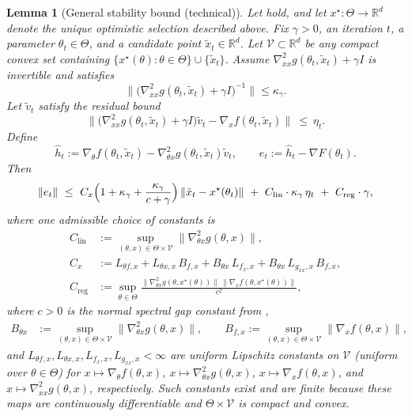\documentclass{article}
\theoremstyle{normaltheorem}
\newtheorem{lemma}[lemma]{Lemma}
\newcommand{\R}{\mathbb{R}}
\begin{document}
\begin{lemma}[General stability bound (technical)]\label{lem:hg-stability-detailed}
Let  hold, and let $x^\star:\Theta\to\R^d$ denote the unique optimistic
selection described above.
Fix \(\gamma>0\), an iteration $t$, a parameter $\theta_t\in\Theta$, and a candidate point $\tilde x_t\in\R^d$.
Let $\mathcal V\subset\R^d$ be any compact convex set containing $\{x^\star(\theta):\theta\in\Theta\}\cup\{\tilde x_t\}$.
Assume \(\nabla^2_{xx}g(\theta_t,\tilde x_t)+\gamma I\) is invertible and satisfies
\[
\big\|\big(\nabla^2_{xx}g(\theta_t,\tilde x_t)+\gamma I\big)^{-1}\big\|\le \kappa_\gamma .
\]
Let $\tilde v_t$ satisfy the residual bound
\[
\big\|\big(\nabla^2_{xx}g(\theta_t,\tilde x_t)+\gamma I\big)\tilde v_t-\nabla_x f(\theta_t,\tilde x_t)\big\|\ \le\ \eta_t.
\]
Define
\[
\widehat h_t
:=
\nabla_\theta f(\theta_t,\tilde x_t)-\nabla^2_{\theta x}g(\theta_t,\tilde x_t)\tilde v_t,
\qquad
e_t:=\widehat h_t-\nabla F(\theta_t).
\]
Then
\[
\|e_t\|\ \le\ C_x\Bigl(1+\kappa_\gamma+\frac{\kappa_\gamma}{c+\gamma}\Bigr)\,\|\tilde x_t-x^\star(\theta_t)\|
\ +\ C_{\mathrm{lin}}\cdot\kappa_\gamma\,\eta_t \ +\ C_{\mathrm{reg}}\cdot\gamma,
\]
where one admissible choice of constants is
\[
\begin{aligned}
C_{\mathrm{lin}}
&:=\sup_{(\theta,x)\in\Theta\times\mathcal V}\|\nabla^2_{\theta x}g(\theta,x)\|,\\[2pt]
C_x
&:=L_{\theta f,x} + L_{\theta x,x}\,B_{f,x} + B_{\theta x}\,L_{f_x,x} + B_{\theta x}\,L_{g_{xx},x}\,B_{f,x},\\
C_{\mathrm{reg}}
&:=\sup_{\theta\in\Theta}
\frac{\|\nabla^2_{\theta x}g(\theta,x^\star(\theta))\|\,\|\nabla_x f(\theta,x^\star(\theta))\|}{c^2},
\end{aligned}
\]
where $c>0$ is the normal spectral gap constant from ,
\[
\begin{aligned}
B_{\theta x}
&:=\sup_{(\theta,x)\in\Theta\times\mathcal V}\|\nabla^2_{\theta x}g(\theta,x)\|,\qquad
B_{f,x}
:=\sup_{(\theta,x)\in\Theta\times\mathcal V}\|\nabla_x f(\theta,x)\|,
\end{aligned}
\]
and $L_{\theta f,x},L_{\theta x,x},L_{f_x,x},L_{g_{xx},x}<\infty$ are uniform Lipschitz constants on $\mathcal V$
(uniform over $\theta\in\Theta$) for
$x\mapsto \nabla_\theta f(\theta,x)$, $x\mapsto \nabla^2_{\theta x}g(\theta,x)$,
$x\mapsto \nabla_x f(\theta,x)$, and $x\mapsto \nabla^2_{xx}g(\theta,x)$, respectively.
Such constants exist and are finite because these maps are continuously differentiable and $\Theta\times\mathcal V$ is compact and convex.
\end{lemma}
\end{document}
